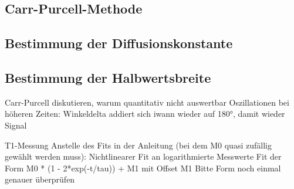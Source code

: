 \subsection{Carr-Purcell-Methode}

\subsection{Bestimmung der Diffusionskonstante}

\subsection{Bestimmung der Halbwertsbreite}


Carr-Purcell diskutieren, warum quantitativ nicht auswertbar
Oszillationen bei höheren Zeiten: Winkeldelta addiert sich iwann
wieder auf 180°, damit wieder Signal

T1-Messung
Anstelle des Fits in der Anleitung (bei dem M0 quasi zufällig gewählt werden muss):
Nichtlinearer Fit an logarithmierte Messwerte
Fit der Form M0 * (1 - 2*exp(-t/tau)) + M1
mit Offset M1
Bitte Form noch einmal genauer überprüfen


